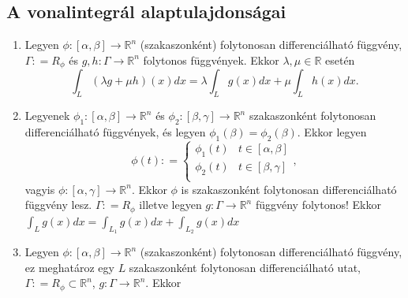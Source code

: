\documentclass[12pt,a4paper]{scrartcl}
\providecommand{\tightlist}{%
  \setlength{\itemsep}{0pt}\setlength{\parskip}{0pt}}
\begin{document}
\hypertarget{a-vonalintegral-alaptulajdonsagai}{%
\subsection{A vonalintegrál
alaptulajdonságai}\label{a-vonalintegral-alaptulajdonsagai}}

\begin{enumerate}
\def\labelenumi{\arabic{enumi}.}
\tightlist
\item
  Legyen
  \(\left. \phi:\left\lbrack {\alpha,\beta} \right\rbrack\rightarrow{\mathbb{R}}^{n} \right.\)
  (szakaszonként) folytonosan differenciálható függvény,
  \(\Gamma: = R_{\phi}\) és
  \(\left. g,h:\Gamma\rightarrow{\mathbb{R}}^{n} \right.\) folytonos
  függvények. Ekkor \(\lambda,\mu \in {\mathbb{R}}\) esetén
  \[{\int_{L}{\left( {\lambda g + \mu h} \right)\left( x \right)dx}} = \lambda{\int_{L}{g\left( x \right)dx}} + \mu{\int_{L}{h\left( x \right)dx.}}\]
\item
  Legyenek
  \(\left. \phi_{1}:\left\lbrack {\alpha,\beta} \right\rbrack\rightarrow{\mathbb{R}}^{n} \right.\)
  és
  \(\left. \phi_{2}:\left\lbrack {\beta,\gamma} \right\rbrack\rightarrow{\mathbb{R}}^{n} \right.\)
  szakaszonként folytonosan differenciálható függvények, és legyen
  \(\phi_{1}\left( \beta \right) = \phi_{2}\left( \beta \right)\). Ekkor
  legyen \[\phi\left( t \right): = \left\{ {\begin{matrix}
  {\phi_{1}\left( t \right)} & {t \in \left\lbrack {\alpha,\beta} \right\rbrack} \\
  {\phi_{2}\left( t \right)} & {t \in \left\lbrack {\beta,\gamma} \right\rbrack} \\
  \end{matrix},} \right.\] vagyis
  \(\left. \phi:\left\lbrack {\alpha,\gamma} \right\rbrack\rightarrow{\mathbb{R}}^{n} \right.\).
  Ekkor \(\phi\) is szakaszonként folytonosan differenciálható függvény
  lesz. \(\Gamma: = R_{\phi}\) illetve legyen
  \(\left. g:\Gamma\rightarrow{\mathbb{R}}^{n} \right.\) függvény
  folytonos! Ekkor
  \({\int_{L}{g\left( x \right)dx}} = {\int_{L_{1}}{g\left( x \right)dx}} + {\int_{L_{2}}{g\left( x \right)dx}}\)
\item
  Legyen
  \(\left. \phi:\left\lbrack {\alpha,\beta} \right\rbrack\rightarrow{\mathbb{R}}^{n} \right.\)
  (szakaszonként) folytonosan differenciálható függvény, ez meghatároz
  egy \(L\) szakaszonként folytonosan differenciálható utat,
  \(\Gamma: = R_{\phi} \subset {\mathbb{R}}^{n}\),
  \(\left. g:\Gamma\rightarrow{\mathbb{R}}^{n} \right.\). Ekkor
  \[\begin{aligned}

\end{aligned}\]
\end{enumerate}
\end{document}
